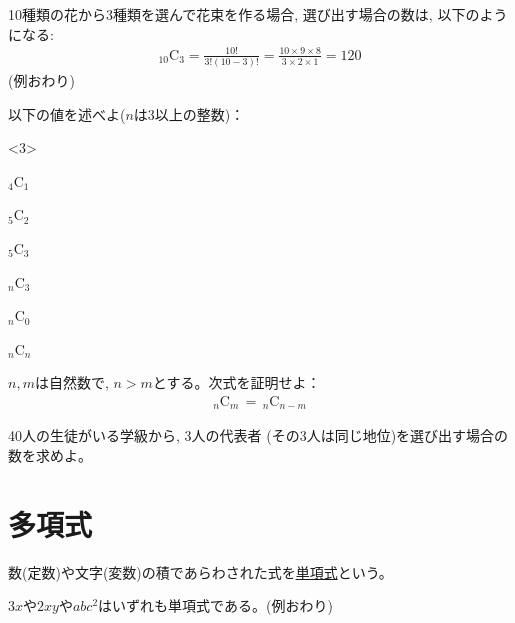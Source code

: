 \begin{exmpl}
10種類の花から3種類を選んで花束を作る場合, 選び出す場合の数は, 以下のようになる:
\begin{eqnarray*}_{10}\text{C}_{3}=\frac{10!}{3!(10-3)!}=\frac{10\times9\times8}{3\times2\times1}=120\end{eqnarray*}
(例おわり)\end{exmpl}
\mv


\begin{q}\label{q:alg_comb3}
 以下の値を述べよ($n$は3以上の整数)：
\begin{edaenumerate}<3>
\item $_4$C$_1$
\item $_5$C$_2$
\item $_5$C$_3$
\item $_n$C$_3$
\item $_n$C$_0$
\item $_n$C$_n$
\end{edaenumerate}
\end{q}
\mv

\begin{q}\label{q:alg_comb1}
 $n, m$は自然数で, $n>m$とする。次式を証明せよ：
\begin{eqnarray}_n\text{C}_m\,=\,_n\text{C}_{n-m}\label{eq:nCmnCn-m}\end{eqnarray}
\end{q}
\mv

\begin{q}\label{q:alg_comb4}
 40人の生徒がいる学級から, 3人の代表者 (その3人は同じ地位)を選び出す場合の数を求めよ。
\end{q}
\hv


\section{多項式}

数(定数)や文字(変数)の積であらわされた式を\underline{単項式}という。
\begin{exmpl} $3x$や$2xy$や$abc^2$はいずれも単項式である。(例おわり)\end{exmpl}

